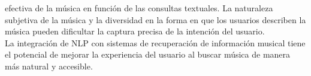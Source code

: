 efectiva de la música en función de las consultas textuales. La naturaleza subjetiva de la música y la 
diversidad en la forma en que los usuarios describen la música pueden dificultar la captura precisa de la intención del usuario. \\
La integración de NLP con sistemas de recuperación de información musical tiene el potencial de mejorar 
la experiencia del usuario al buscar música de manera más natural y accesible.\\ 








